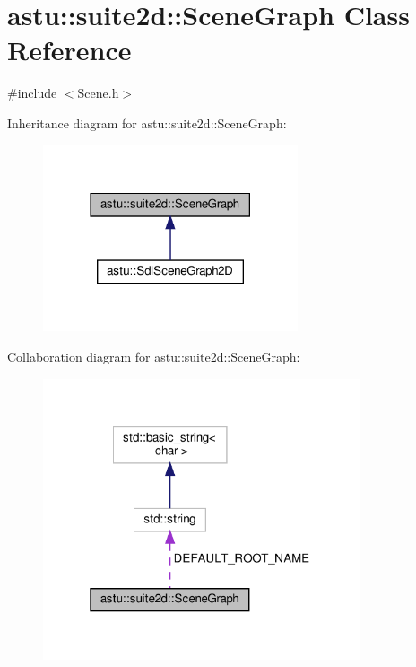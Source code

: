 \hypertarget{classastu_1_1suite2d_1_1SceneGraph}{}\section{astu\+:\+:suite2d\+:\+:Scene\+Graph Class Reference}
\label{classastu_1_1suite2d_1_1SceneGraph}


{\ttfamily \#include $<$Scene.\+h$>$}



Inheritance diagram for astu\+:\+:suite2d\+:\+:Scene\+Graph\+:\nopagebreak
\begin{figure}[H]
\begin{center}
\leavevmode
\includegraphics[width=213pt]{classastu_1_1suite2d_1_1SceneGraph__inherit__graph}
\end{center}
\end{figure}


Collaboration diagram for astu\+:\+:suite2d\+:\+:Scene\+Graph\+:\nopagebreak
\begin{figure}[H]
\begin{center}
\leavevmode
\includegraphics[width=265pt]{classastu_1_1suite2d_1_1SceneGraph__coll__graph}
\end{center}
\end{figure}
